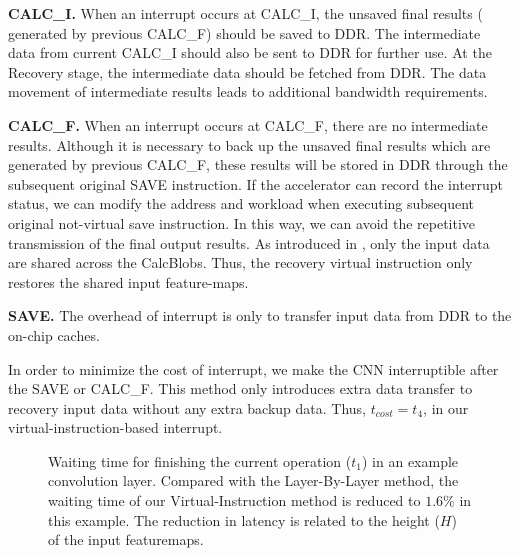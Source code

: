 \textbf{CALC\_I.} 
When an interrupt occurs at CALC\_I, the unsaved final results ( generated by previous CALC\_F) should be saved to DDR. The intermediate data from current CALC\_I should also be sent to DDR for further use. At the Recovery stage, the intermediate data should be fetched from DDR. The data movement of intermediate results leads to additional bandwidth requirements.


\textbf{CALC\_F.}
When an interrupt occurs at CALC\_F, there are no intermediate results. 
Although it is necessary to back up the unsaved final results which are generated by previous CALC\_F, these results will be stored in DDR through the subsequent original SAVE instruction.
If the accelerator can record the interrupt status, we can modify the address and workload when executing subsequent original not-virtual save instruction.
In this way, we can avoid the repetitive transmission of the final output results.
As introduced in , only the input data are shared across the CalcBlobs. Thus, the recovery virtual instruction only restores the shared input feature-maps.



\textbf{SAVE.}
The overhead of interrupt is only to transfer input data from DDR to the on-chip caches. 

In order to minimize the cost of interrupt, we make the CNN interruptible after the SAVE or CALC\_F. This method only introduces extra data transfer to recovery input data without any extra backup data. Thus, $t_{cost} = t_4$, in our virtual-instruction-based interrupt.



\begin{figure}[t]
	\centering
	\label{fig:t1example}
	\caption{ Waiting time for finishing the current operation ($t_1$) in an example convolution layer. Compared with the Layer-By-Layer method, the waiting time of our Virtual-Instruction method is reduced to $1.6\%$ in this example. The reduction in latency is related to the height ($H$) of the input featuremaps.  }
\end{figure}



